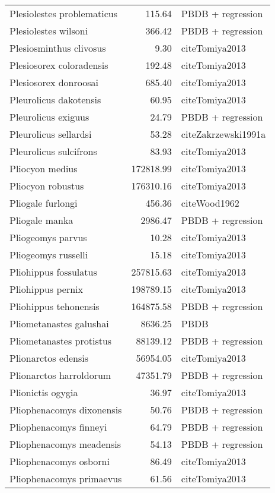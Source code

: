 \begin{table}[ht]
\begin{tabular}{lrl}
  Plesiolestes problematicus & 115.64 & PBDB + regression \\ 
  Plesiolestes wilsoni & 366.42 & PBDB + regression \\ 
  Plesiosminthus clivosus & 9.30 & cite{Tomiya2013} \\ 
  Plesiosorex coloradensis & 192.48 & cite{Tomiya2013} \\ 
  Plesiosorex donroosai & 685.40 & cite{Tomiya2013} \\ 
  Pleurolicus dakotensis & 60.95 & cite{Tomiya2013} \\ 
  Pleurolicus exiguus & 24.79 & PBDB + regression \\ 
  Pleurolicus sellardsi & 53.28 & cite{Zakrzewski1991a} \\ 
  Pleurolicus sulcifrons & 83.93 & cite{Tomiya2013} \\ 
  Pliocyon medius & 172818.99 & cite{Tomiya2013} \\ 
  Pliocyon robustus & 176310.16 & cite{Tomiya2013} \\ 
  Pliogale furlongi & 456.36 & cite{Wood1962} \\ 
  Pliogale manka & 2986.47 & PBDB + regression \\ 
  Pliogeomys parvus & 10.28 & cite{Tomiya2013} \\ 
  Pliogeomys russelli & 15.18 & cite{Tomiya2013} \\ 
  Pliohippus fossulatus & 257815.63 & cite{Tomiya2013} \\ 
  Pliohippus pernix & 198789.15 & cite{Tomiya2013} \\ 
  Pliohippus tehonensis & 164875.58 & PBDB + regression \\ 
  Pliometanastes galushai & 8636.25 & PBDB \\ 
  Pliometanastes protistus & 88139.12 & PBDB + regression \\ 
  Plionarctos edensis & 56954.05 & cite{Tomiya2013} \\ 
  Plionarctos harroldorum & 47351.79 & PBDB + regression \\ 
  Plionictis ogygia & 36.97 & cite{Tomiya2013} \\ 
  Pliophenacomys dixonensis & 50.76 & PBDB + regression \\ 
  Pliophenacomys finneyi & 64.79 & PBDB + regression \\ 
  Pliophenacomys meadensis & 54.13 & PBDB + regression \\ 
  Pliophenacomys osborni & 86.49 & cite{Tomiya2013} \\ 
  Pliophenacomys primaevus & 61.56 & cite{Tomiya2013} \\ 

\end{tabular}
\end{table}
